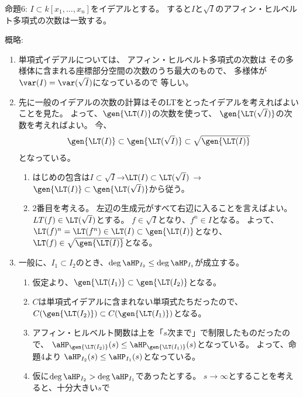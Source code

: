 \begin{framed}
  命題6:
  $I\subset k[x_1,\dots,x_n]$をイデアルとする。
  すると$I$と$\sqrt{I}$のアフィン・ヒルベルト多項式の次数は一致する。
\end{framed}
\begin{myproof}
  概略:
  \begin{enumerate}
    \item 単項式イデアルについては、
    アフィン・ヒルベルト多項式の次数は
    その多様体に含まれる座標部分空間の次数のうち最大のもので、
    多様体が$\var(I) = \var(\sqrt{I})$になっているので
    等しい。
    \item
    先に一般のイデアルの次数の計算はそのLTをとったイデアルを考えればよいことを見た。
    よって、$\gen{\LT(I)}$の次数を使って、
    $\gen{\LT(\sqrt{I})}$の次数を考えればよい。
    今、
    \begin{align}
      \gen{\LT(I)} \subset \gen{\LT(\sqrt{I})} \subset \sqrt{\gen{\LT(I)}}
    \end{align}
    となっている。
    \begin{enumerate}
      \item はじめの包含は$I\subset \sqrt{I}$→$\LT(I) \subset \LT(\sqrt{I})$
      →$\gen{\LT(I)} \subset \gen{\LT(\sqrt{I})}$から従う。
      \item
      2番目を考える。
      左辺の生成元がすべて右辺に入ることを言えばよい。
      $LT(f) \in \LT(\sqrt{I})$とする。
      $f\in \sqrt{I}$となり、$f^n \in I$となる。
      よって、$\LT(f)^n = \LT(f^n) \in \LT(I) \subset \gen{\LT(I)}$となり、
      $\LT(f) \in \sqrt{\gen{\LT(I)}}$となる。
    \end{enumerate}
    \item
    一般に、$I_1 \subset I_2$のとき、$
    \deg \aHP_{I_2} \le \deg \aHP_{I_1}$が成立する。
    \begin{enumerate}
      \item 仮定より、$\gen{\LT(I_1)} \subset \gen{\LT(I_2)}$となる。
      \item $C$は単項式イデアルに含まれない単項式たちだったので、
      $C(\gen{\LT(I_2)}) \subset C(\gen{\LT(I_1)})$となる。
      \item
      アフィン・ヒルベルト関数は上を「$s$次まで」で制限したものだったので、
      $\aHP_{\gen{\LT(I_2)}}(s) \le \aHP_{\gen{\LT(I_1)}}(s)$となっている。
      よって、命題4より
      $\aHP_{I_2}(s) \le \aHP_{I_1}(s)$となっている。
      \item
      仮に$\deg \aHP_{I_2} > \deg \aHP_{I_1}$であったとする。
      $s\to \infty$とすることを考えると、十分大きい$s$で

\end{enumerate}
\end{enumerate}
\end{myproof}
